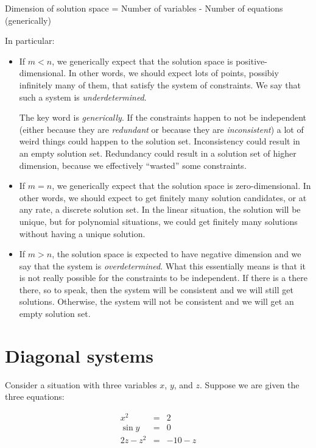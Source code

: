 \documentclass[10pt]{amsart}
\begin{document}
Dimension of solution space = Number of variables - Number of
equations (generically)

In particular:

\begin{itemize}
\item If $m < n$, we generically expect that the solution space is
  positive-dimensional. In other words, we should expect lots of
  points, possibiy infinitely many of them, that satisfy the system of
  constraints. We say that such a system is {\em underdetermined}.

  The key word is {\em generically}. If the constraints happen to not
  be independent (either because they are {\em redundant} or because
  they are {\em inconsistent}) a lot of weird things could happen to
  the solution set. Inconsistency could result in an empty solution
  set. Redundancy could result in a solution set of higher dimension,
  because we effectively ``wasted'' some constraints.
\item If $m = n$, we generically expect that the solution space is
  zero-dimensional. In other words, we should expect to get finitely
  many solution candidates, or at any rate, a discrete solution
  set. In the linear situation, the solution will be unique, but for
  polynomial situations, we could get finitely many solutions without
  having a unique solution.
\item If $m > n$, the solution space is expected to have negative
  dimension and we say that the system is {\em overdetermined}. What
  this essentially means is that it is not really possible for the
  constraints to be independent. If there is a there there, so to
  speak, then the system will be consistent and we will still get
  solutions. Otherwise, the system will not be consistent and we will
  get an empty solution set.
\end{itemize}

\section{Diagonal systems}

Consider a situation with three variables $x$, $y$, and $z$. Suppose
we are given the three equations:

\begin{eqnarray*}
  x^2 & = & 2 \\
  \sin y & = & 0 \\
  2z - z^2 & = & -10 - z \\
\end{eqnarray*}
\end{document}
